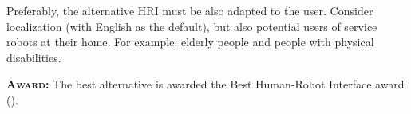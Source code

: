 Preferably, the alternative HRI must be also adapted to the user.
Consider localization (with English as the default), but also potential users of service robots at their home.
For example: elderly people and people with physical disabilities.

\textbf{\textsc{Award:}} The best alternative is awarded the Best Human-Robot Interface award ().


